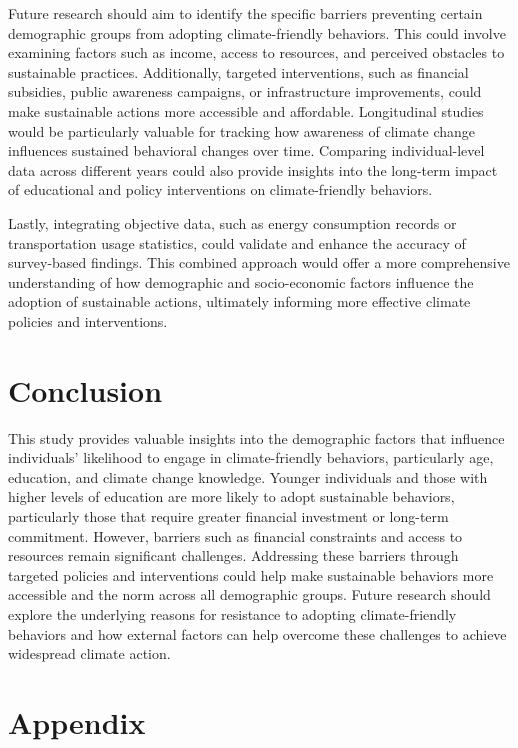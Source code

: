 \documentclass[
  letterpaper,
  DIV=11,
  numbers=noendperiod]{scrartcl}
\begin{document}
Future research should aim to identify the specific barriers preventing
certain demographic groups from adopting climate-friendly behaviors.
This could involve examining factors such as income, access to
resources, and perceived obstacles to sustainable practices.
Additionally, targeted interventions, such as financial subsidies,
public awareness campaigns, or infrastructure improvements, could make
sustainable actions more accessible and affordable. Longitudinal studies
would be particularly valuable for tracking how awareness of climate
change influences sustained behavioral changes over time. Comparing
individual-level data across different years could also provide insights
into the long-term impact of educational and policy interventions on
climate-friendly behaviors.

Lastly, integrating objective data, such as energy consumption records
or transportation usage statistics, could validate and enhance the
accuracy of survey-based findings. This combined approach would offer a
more comprehensive understanding of how demographic and socio-economic
factors influence the adoption of sustainable actions, ultimately
informing more effective climate policies and interventions.

\section{Conclusion}\label{sec-conclusion}

This study provides valuable insights into the demographic factors that
influence individuals' likelihood to engage in climate-friendly
behaviors, particularly age, education, and climate change knowledge.
Younger individuals and those with higher levels of education are more
likely to adopt sustainable behaviors, particularly those that require
greater financial investment or long-term commitment. However, barriers
such as financial constraints and access to resources remain significant
challenges. Addressing these barriers through targeted policies and
interventions could help make sustainable behaviors more accessible and
the norm across all demographic groups. Future research should explore
the underlying reasons for resistance to adopting climate-friendly
behaviors and how external factors can help overcome these challenges to
achieve widespread climate action.

\newpage

\appendix

\section{Appendix}\label{sec-appendix}
\end{document}

